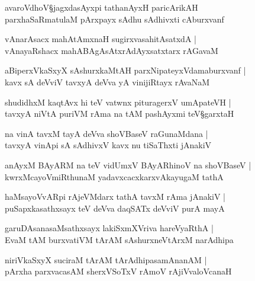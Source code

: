 \begin{shloka}
avaroVdhoV\S jagxdasAyxpi tathanAyxH paricArikAH\\
parxhaSaRmatulaM pArxpayx sAdhu sAdhivxti cAburxvanf
\end{shloka}

\begin{shloka}
vAnarAsacx mahAtAmxnaH sugirxvasahitAsatxdA |\\
vAnayaRshacx mahABAgAsAtxrAdAyxsatxtarx rAGavaM
\end{shloka}

\begin{shloka}
aBiperxVkaSxyX sAshurxkaMtAH parxNipateyxVdamaburxvanf |\\
kavx sA deVviV tavxyA deVva yA vinijiRtayx rAvaNaM
\end{shloka}

\begin{shloka}
shudidhxM kaqtAvx hi teV vatwnx pituragerxV umApateVH |\\
tavxyA niVtA puriVM rAma na tAM pashAyxmi teV\S garxtaH 
\end{shloka}

\begin{shloka}
na vinA tavxM tayA deVva shoVBaseV raGunaMdana |\\
tavxyA vinApi sA sAdhivxV kavx nu tiSaThxti jAnakiV
\end{shloka}

\begin{shloka}
anAyxM BAyARM na teV vidUmxV BAyARhinoV na shoVBaseV |\\
kwrxMcayoVmiRthunaM yadavxcacxkarxvAkayugaM tathA
\end{shloka}

\begin{shloka}
haMsayoVvARpi rAjeVMdarx tathA tavxM rAma jAnakiV |\\
puSapxkasathxsayx teV deVva daqSATx deVviV purA mayA
\end{shloka}

\begin{shloka}
garuDAsanasaMsathxsayx lakiSxmXVriva hareVyaRthA |\\
EvaM tAM burxvatiVM tArAM sAshurxneVtArxM narAdhipa 
\end{shloka}

\begin{shloka}
niriVkaSxyX suciraM tArAM tArAdhipasamAnanAM |\\
pArxha parxvacasAM sherxVSoTxV rAmoV rAjiVvaloVcanaH 
\end{shloka}

